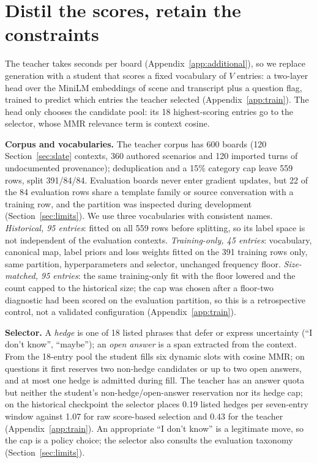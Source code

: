 \section{Distil the scores, retain the constraints}\label{sec:distil}
The teacher takes seconds per board (Appendix~\ref{app:additional}), so we replace generation with a student that scores a fixed vocabulary of $V$ entries: a two-layer head over the MiniLM embeddings of scene and transcript plus a question flag, trained to predict which entries the teacher selected (Appendix~\ref{app:train}). The head only chooses the candidate pool: its 18 highest-scoring entries go to the selector, whose MMR relevance term is context cosine.

\textbf{Corpus and vocabularies.} The teacher corpus has 600 boards (120 Section~\ref{sec:slate} contexts, 360 authored scenarios and 120 imported turns of undocumented provenance); deduplication and a 15\% category cap leave 559 rows, split 391/84/84. Evaluation boards never enter gradient updates, but 22 of the 84 evaluation rows share a template family or source conversation with a training row, and the partition was inspected during development (Section~\ref{sec:limits}). %
We use three vocabularies with consistent names. \emph{Historical, 95 entries}: fitted on all 559 rows before splitting, so its label space is not independent of the evaluation contexts. \emph{Training-only, 45 entries}: vocabulary, canonical map, label priors and loss weights fitted on the 391 training rows only, same partition, hyperparameters and selector, unchanged frequency floor. %
\emph{Size-matched, 95 entries}: the same training-only fit with the floor lowered and the count capped to the historical size; the cap was chosen after a floor-two diagnostic had been scored on the evaluation partition, so this is a retrospective control, not a validated configuration (Appendix~\ref{app:train}). %

\textbf{Selector.} A \emph{hedge} is one of 18 listed phrases that defer or express uncertainty (``I don't know'', ``maybe''); an \emph{open answer} is a span extracted from the context. From the 18-entry pool the student fills six dynamic slots with cosine MMR; on questions it first reserves two non-hedge candidates or up to two open answers, and at most one hedge is admitted during fill. The teacher has an answer quota but neither the student's non-hedge/open-answer reservation nor its hedge cap; on the historical checkpoint the selector places 0.19 listed hedges per seven-entry window against 1.07 for raw score-based selection and 0.43 for the teacher (Appendix~\ref{app:train}). %
An appropriate ``I don't know'' is a legitimate move, so the cap is a policy choice; the selector also consults the evaluation taxonomy (Section~\ref{sec:limits}).

